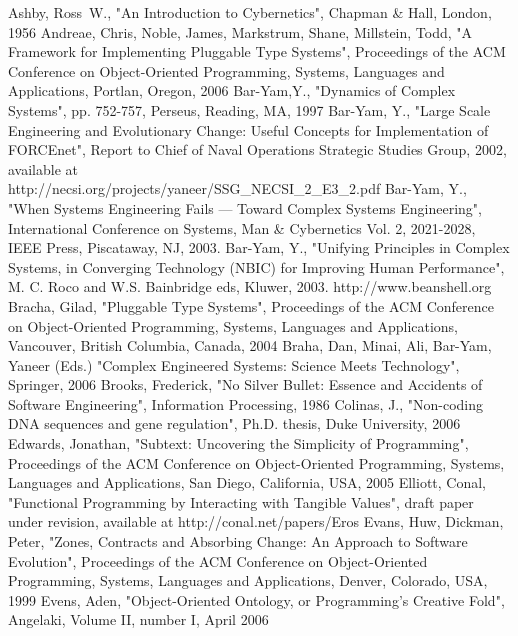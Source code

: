 \documentclass[10pt]{sigplanconf}
\begin{document}
\begin{thebibliography}{}

Ashby, Ross~W., "An Introduction to Cybernetics", Chapman \& Hall, London, 1956
Andreae, Chris, Noble, James, Markstrum, Shane, Millstein, Todd, "A Framework for Implementing Pluggable Type Systems", Proceedings of the ACM Conference on Object-Oriented Programming, Systems, Languages and Applications, Portlan, Oregon, 2006
Bar-Yam,Y., "Dynamics of Complex Systems", pp. 752-757, Perseus, Reading, MA, 1997
Bar-Yam, Y., "Large Scale Engineering and Evolutionary Change: Useful Concepts for Implementation of FORCEnet", Report to Chief of Naval Operations Strategic Studies Group, 2002, available at \\
http://necsi.org/projects/yaneer/SSG\_NECSI\_2\_E3\_2.pdf
Bar-Yam, Y., "When Systems Engineering Fails --- Toward Complex Systems Engineering", International Conference on Systems, Man \& Cybernetics Vol. 2, 2021-2028, IEEE Press, Piscataway, NJ, 2003.
Bar-Yam, Y., "Unifying Principles in Complex Systems, in Converging Technology (NBIC) for Improving Human Performance", M. C. Roco and W.S. Bainbridge eds, Kluwer, 2003.
 http://www.beanshell.org
Bracha, Gilad, "Pluggable Type Systems", Proceedings of the ACM Conference on Object-Oriented Programming, Systems, Languages and Applications,  Vancouver, British Columbia, Canada, 2004
Braha, Dan, Minai, Ali, Bar-Yam, Yaneer (Eds.) "Complex Engineered Systems: Science Meets Technology", Springer, 2006
Brooks, Frederick, "No Silver Bullet: Essence and Accidents of Software Engineering", Information Processing, 1986
Colinas, J., "Non-coding DNA sequences and gene regulation", Ph.D. thesis, Duke University, 2006
Edwards, Jonathan, "Subtext: Uncovering the Simplicity of Programming", Proceedings of the ACM Conference on Object-Oriented Programming, Systems, Languages and Applications, San Diego, California, USA, 2005
Elliott, Conal, "Functional Programming by Interacting with Tangible Values",  draft paper under revision, available at http://conal.net/papers/Eros
Evans, Huw, Dickman, Peter, "Zones, Contracts and Absorbing  Change: An Approach to Software Evolution", Proceedings of the ACM Conference on Object-Oriented Programming, Systems, Languages and Applications, Denver, Colorado, USA, 1999
Evens, Aden, "Object-Oriented Ontology, or Programming's Creative Fold", Angelaki, Volume II, number I, April 2006

\end{thebibliography}
\end{document}
